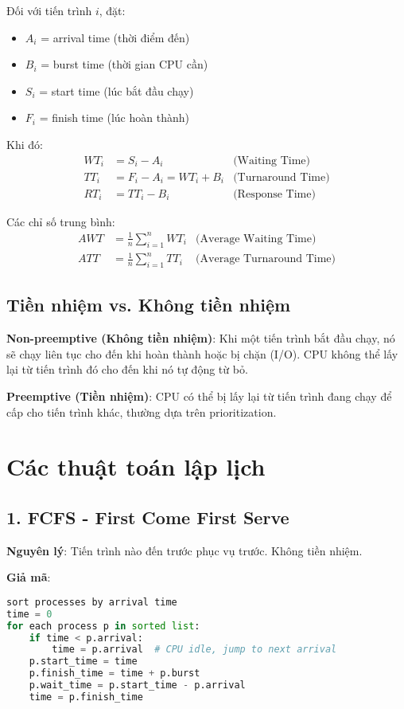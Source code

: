 Đối với tiến trình $i$, đặt:
\begin{itemize}[leftmargin=1.5cm]
  \item $A_i$ = arrival time (thời điểm đến)
  \item $B_i$ = burst time (thời gian CPU cần)
  \item $S_i$ = start time (lúc bắt đầu chạy)
  \item $F_i$ = finish time (lúc hoàn thành)
\end{itemize}

Khi đó:
\begin{align}
WT_i &= S_i - A_i & \text{(Waiting Time)} \\
TT_i &= F_i - A_i = WT_i + B_i & \text{(Turnaround Time)} \\
RT_i &= TT_i - B_i & \text{(Response Time)}
\end{align}

Các chỉ số trung bình:
\begin{align}
AWT &= \frac{1}{n}\sum_{i=1}^{n} WT_i & \text{(Average Waiting Time)} \\
ATT &= \frac{1}{n}\sum_{i=1}^{n} TT_i & \text{(Average Turnaround Time)}
\end{align}

\subsection{Tiền nhiệm vs. Không tiền nhiệm}

\textbf{Non-preemptive (Không tiền nhiệm)}: Khi một tiến trình bắt đầu chạy, 
nó sẽ chạy liên tục cho đến khi hoàn thành hoặc bị chặn (I/O). CPU không thể 
lấy lại từ tiến trình đó cho đến khi nó tự động từ bỏ.

\textbf{Preemptive (Tiền nhiệm)}: CPU có thể bị lấy lại từ tiến trình đang chạy 
để cấp cho tiến trình khác, thường dựa trên prioritization.

\section{Các thuật toán lập lịch}

\subsection{1. FCFS - First Come First Serve}

\textbf{Nguyên lý}: Tiến trình nào đến trước phục vụ trước. Không tiền nhiệm.

\textbf{Giả mã}:
\begin{lstlisting}[language=Python,caption={FCFS pseudocode}]
sort processes by arrival time
time = 0
for each process p in sorted list:
    if time < p.arrival:
        time = p.arrival  # CPU idle, jump to next arrival
    p.start_time = time
    p.finish_time = time + p.burst
    p.wait_time = p.start_time - p.arrival
    time = p.finish_time
\end{lstlisting}


